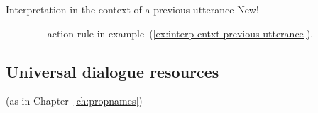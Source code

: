 \begin{description}
\begin{enumerate}
 
\end{enumerate}

\item[Interpretation in the context of a previous utterance New!] ---
  action rule in example~(\ref{ex:interp-cntxt-previous-utterance}).

\end{description}


\subsection{Universal dialogue resources} (as in Chapter~\ref{ch:propnames})


  

  

  



